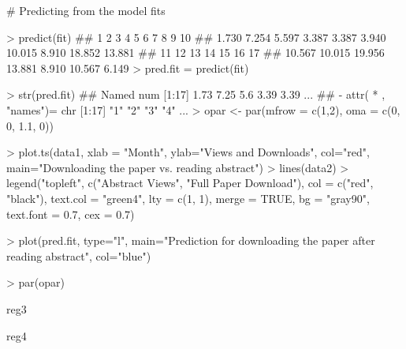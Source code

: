 # Predicting from the model fits

> predict(fit)
##      1      2      3      4      5      6      7      8      9     10 
##  1.730  7.254  5.597  3.387  3.387  3.940 10.015  8.910 18.852 13.881 
##     11     12     13     14     15     16     17 
## 10.567 10.015 19.956 13.881  8.910 10.567  6.149
> pred.fit = predict(fit)

> str(pred.fit)
##  Named num [1:17] 1.73 7.25 5.6 3.39 3.39 ...
##  - attr(       * , "names")= chr [1:17] "1" "2" "3" "4" ...
> opar <- par(mfrow = c(1,2), oma = c(0, 0, 1.1, 0))

> plot.ts(data1, xlab = "Month", ylab="Views and Downloads", col="red", main="Downloading the paper vs. reading abstract")
> lines(data2)
> legend("topleft", c("Abstract Views", "Full Paper Download"), col = c("red", "black"), text.col = "green4", lty = c(1, 1), merge = TRUE, bg = "gray90", text.font = 0.7, cex = 0.7)

> plot(pred.fit, type="l", main="Prediction for downloading the paper after reading abstract", col="blue")

> par(opar)

reg3


reg4
